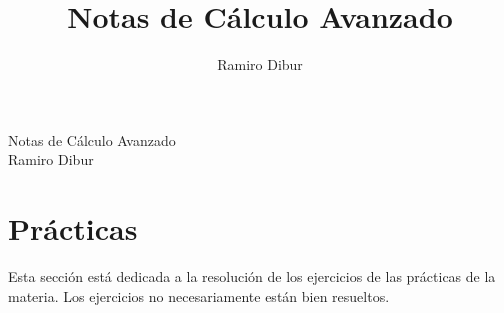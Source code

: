 \documentclass[11pt]{article}
\title{\Huge  \color{HTML}{5A0000} Notas de Cálculo Avanzado}
\author{Ramiro Dibur}
\date{}
\begin{document}
\vspace*{\fill}
\begin{center}
    {\Huge  Notas de Cálculo Avanzado} \\[1em]
    {\large Ramiro Dibur}
\end{center}
\vspace*{\fill}
\newpage
{}
\newpage
\tableofcontents
\newpage







\newpage
\section{Prácticas}

Esta sección está dedicada a la resolución de los ejercicios de las prácticas de la materia. Los ejercicios no necesariamente están bien resueltos. 


\end{document}
